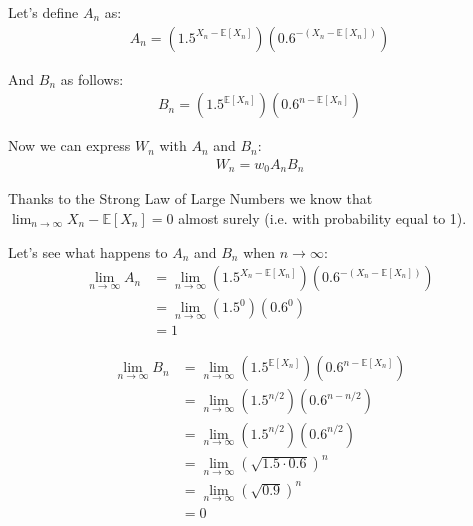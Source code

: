 \documentclass[12pt]{article}
\begin{document}
Let's define $A_n$ as:
\begin{align}
  \begin{equation*}
    A_n = \left(1.5^{X_n - \mathbb{E}[X_n]}\right) \left(0.6^{-(X_n - \mathbb{E}[X_n])}\right)
  \end{equation*}
\end{align}

And $B_n$ as follows:
\begin{align}
  \begin{equation*}
    B_n = \left(1.5^{\mathbb{E}[X_n]}\right) \left(0.6^{n - \mathbb{E}[X_n]}\right)
  \end{equation*}
\end{align}

Now we can express $W_n$ with $A_n$ and $B_n$:
\begin{align}
  \begin{equation*}
    W_n = w_0 A_n  B_n
  \end{equation*}
\end{align}

Thanks to the Strong Law of Large Numbers we know that $\lim_{n\to\infty}{X_n - \mathbb{E}[X_n]} = 0$ almost surely (i.e. with probability equal to 1).

Let's see what happens to $A_n$ and $B_n$ when $n \rightarrow \infty$:
\begin{equation*}
  \begin{split}
    \lim_{n\to\infty} A_n &= \lim_{n\to\infty} \left(1.5^{X_n - \mathbb{E}[X_n]}\right) \left(0.6^{-(X_n - \mathbb{E}[X_n])}\right)\\
    &= \lim_{n\to\infty} \left(1.5^0\right) \left(0.6^0\right)\\
    & = 1
  \end{split}
\end{equation*}

\begin{equation*}
  \begin{split}
    \lim_{n\to\infty} B_n &=  \lim_{n\to\infty} \left(1.5^{\mathbb{E}[X_n]}\right) \left(0.6^{n - \mathbb{E}[X_n]}\right)\\
    &= \lim_{n\to\infty} \left(1.5^{n/2}\right) \left(0.6^{n - n/2}\right)\\
    &= \lim_{n\to\infty} \left(1.5^{n/2}\right) \left(0.6^{n/2}\right)\\
    &= \lim_{n\to\infty} \left(\sqrt{1.5 \cdot 0.6}\right)^{n}\\
    &= \lim_{n\to\infty} \left(\sqrt{0.9}\right) ^{n}\\
    &= 0
  \end{split}
\end{equation*}
\end{document}

